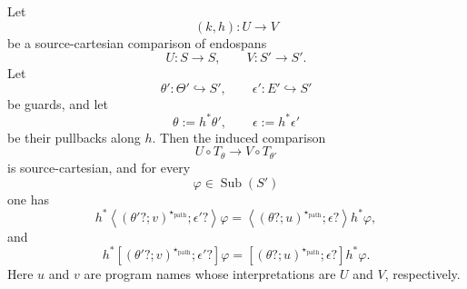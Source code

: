 \begin{corollary}
\label{cor:stability-guarded-while-feedback}
Let
\[
  (k,h):U\to V
\]
be a source-cartesian comparison of endospans
\[
  U:S\to S,
  \qquad
  V:S'\to S'.
\]
Let
\[
  \theta':\Theta'\hookrightarrow S',
  \qquad
  \epsilon':E'\hookrightarrow S'
\]
be guards, and let
\[
  \theta:=h^\ast\theta',
  \qquad
  \epsilon:=h^\ast\epsilon'
\]
be their pullbacks along \(h\). Then the induced comparison
\[
  U\circ T_\theta\longrightarrow V\circ T_{\theta'}
\]
is source-cartesian, and for every
\[
  \varphi\in\operatorname{Sub}(S')
\]
one has
\[
  h^\ast
  \left\langle
    (\theta'?;v)^{\star_{\mathrm{path}}};\epsilon'?
  \right\rangle\varphi
  =
  \left\langle
    (\theta?;u)^{\star_{\mathrm{path}}};\epsilon?
  \right\rangle
  h^\ast\varphi,
\]
and
\[
  h^\ast
  \left[
    (\theta'?;v)^{\star_{\mathrm{path}}};\epsilon'?
  \right]\varphi
  =
  \left[
    (\theta?;u)^{\star_{\mathrm{path}}};\epsilon?
  \right]
  h^\ast\varphi.
\]
Here \(u\) and \(v\) are program names whose interpretations are \(U\) and
\(V\), respectively.
\end{corollary}

